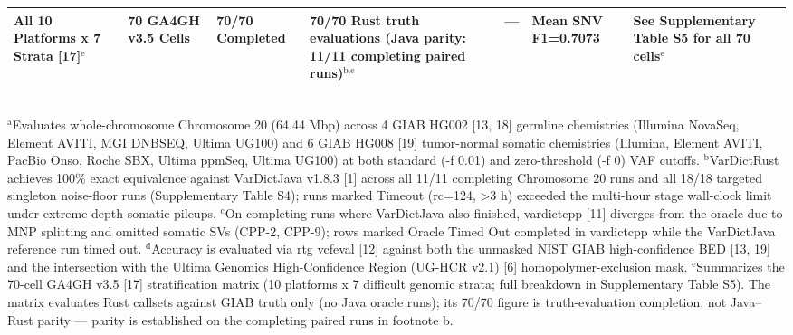 \begin{table}[htbp]
{\begin{tabular}{lllllll}
All 10 Platforms x 7 Strata [17]$^{\text{e}}$ & 70 GA4GH v3.5 Cells & 70/70 Completed & 70/70 Rust truth evaluations (Java parity: 11/11 completing paired runs)$^{\text{b,e}}$ & --- & Mean SNV F1=0.7073 & See Supplementary Table S5 for all 70 cells$^{\text{e}}$ \\
\hline
\end{tabular}%
}
\\[4pt]\footnotesize{$^{\text{a}}$Evaluates whole-chromosome Chromosome 20 (64.44 Mbp) across 4 GIAB HG002 [13, 18] germline chemistries (Illumina NovaSeq, Element AVITI, MGI DNBSEQ, Ultima UG100) and 6 GIAB HG008 [19] tumor-normal somatic chemistries (Illumina, Element AVITI, PacBio Onso, Roche SBX, Ultima ppmSeq, Ultima UG100) at both standard (-f 0.01) and zero-threshold (-f 0) VAF cutoffs. $^{\text{b}}$VarDictRust achieves 100\% exact equivalence against VarDictJava v1.8.3 [1] across all 11/11 completing Chromosome 20 runs and all 18/18 targeted singleton noise-floor runs (Supplementary Table S4); runs marked Timeout (rc=124, \textgreater{}3 h) exceeded the multi-hour stage wall-clock limit under extreme-depth somatic pileups. $^{\text{c}}$On completing runs where VarDictJava also finished, vardictcpp [11] diverges from the oracle due to MNP splitting and omitted somatic SVs (CPP-2, CPP-9); rows marked Oracle Timed Out completed in vardictcpp while the VarDictJava reference run timed out. $^{\text{d}}$Accuracy is evaluated via rtg vcfeval [12] against both the unmasked NIST GIAB high-confidence BED [13, 19] and the intersection with the Ultima Genomics High-Confidence Region (UG-HCR v2.1) [6] homopolymer-exclusion mask. $^{\text{e}}$Summarizes the 70-cell GA4GH v3.5 [17] stratification matrix (10 platforms x 7 difficult genomic strata; full breakdown in Supplementary Table S5). The matrix evaluates Rust callsets against GIAB truth only (no Java oracle runs); its 70/70 figure is truth-evaluation completion, not Java--Rust parity --- parity is established on the completing paired runs in footnote b.}
\end{table}
